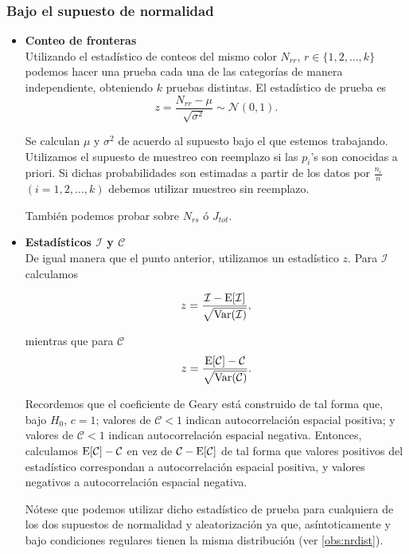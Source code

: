 \subsubsection{Bajo el supuesto de normalidad}
  \begin{itemize}
    \item \textbf{Conteo de fronteras} \\
    Utilizando el estadístico de conteos del mismo color $N_{rr}$, $r \in \{ 1,2, \dots, k\}$ podemos hacer una prueba cada una de las categorías de manera independiente, obteniendo $k$ pruebas distintas. El estadístico de prueba es 
    \begin{equation}
    z = \dfrac{N_{rr} - \mu}{\sqrt{\sigma^2}} \sim \mathcal{N}(0, 1).
    \end{equation}
   
    Se calculan $\mu$ y $\sigma^2$ de acuerdo al supuesto bajo el que estemos trabajando. Utilizamos el supuesto de muestreo con reemplazo si las $p_i$'s son conocidas a priori. Si dichas probabilidades son estimadas a partir de los datos por $\frac{n_i}{n}$ $(i=1, 2, \dots, k)$ debemos utilizar muestreo sin reemplazo.

    También podemos probar sobre $N_{rs}$ ó $J_{tot}$.
    \item \textbf{Estadísticos $\mathcal{I}$ y $\mathcal{C}$} \\
    De igual manera que el punto anterior, utilizamos un estadístico $z$. Para $\mathcal{I}$ calculamos

    \begin{equation}
    z = \dfrac{\mathcal{I} - {\rm{E}}[\mathcal{I}]}{\sqrt{{\rm{Var}}(\mathcal{I})}},
    \end{equation}

    mientras que para $\mathcal{C}$
    \begin{equation}\label{eq:zgeary}
    z = \dfrac{{\rm{E}}[\mathcal{C}]-\mathcal{C}}{\sqrt{{\rm{Var}}(\mathcal{C})}}.
    \end{equation}

    Recordemos que el coeficiente de Geary está construido de tal forma que, bajo $H_0$, $c=1$; valores de  $\mathcal{C}<1$ indican autocorrelación espacial positiva; y valores de  $\mathcal{C}<1$ indican autocorrelación espacial negativa. Entonces, calculamos ${\rm{E}}[\mathcal{C}]-\mathcal{C}$ en vez de $\mathcal{C}-{\rm{E}}[\mathcal{C}]$ de tal forma que valores positivos del estadístico correspondan a autocorrelación espacial positiva, y valores negativos a autocorrelación espacial negativa.

    Nótese que podemos utilizar dicho estadístico de prueba para cualquiera de los dos supuestos de normalidad y aleatorización ya que, asíntoticamente y bajo condiciones regulares tienen la misma distribución (ver \ref{obs:nrdist}).
  \end{itemize}

